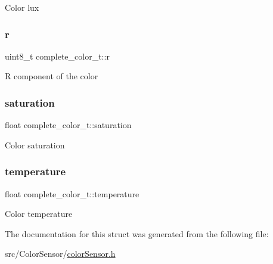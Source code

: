 Color lux \mbox{\label{structcomplete__color__t_ac605821913e9c5ddff13bc370c2de3e2}} 
\subsubsection{\texorpdfstring{r}{r}}
{\footnotesize\ttfamily uint8\+\_\+t complete\+\_\+color\+\_\+t\+::r}

R component of the color \mbox{\label{structcomplete__color__t_a2313d29f7027137dd1916101eaa4cbd8}} 
\subsubsection{\texorpdfstring{saturation}{saturation}}
{\footnotesize\ttfamily float complete\+\_\+color\+\_\+t\+::saturation}

Color saturation \mbox{\label{structcomplete__color__t_aa509dee15580b1e32af8c2709c5ee104}} 
\subsubsection{\texorpdfstring{temperature}{temperature}}
{\footnotesize\ttfamily float complete\+\_\+color\+\_\+t\+::temperature}

Color temperature 

The documentation for this struct was generated from the following file\+:\begin{DoxyCompactItemize}
\item 
src/\+Color\+Sensor/\hyperlink{colorSensor_8h}{color\+Sensor.\+h}\end{DoxyCompactItemize}
